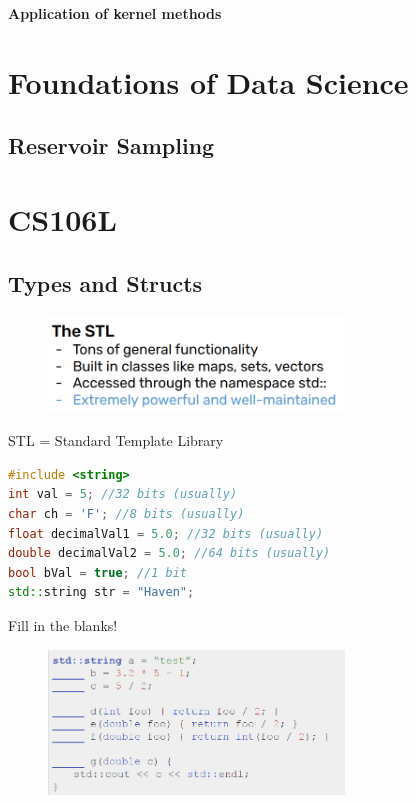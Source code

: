 \documentclass[12pt, a4paper, oneside]{ctexbook}
\begin{document}
\newpage

\textbf{Application of kernel methods}

\hspace*{\fill}


\chapter{Foundations of Data Science}

\section{Reservoir Sampling}


















\chapter{CS106L}

\section{Types and Structs}

  \begin{figure}[h]
		\centering 
		\includegraphics[width=0.7\textwidth]{images1.png} 
	\end{figure}

STL = Standard Template Library

\begin{lstlisting}[language=c++]
#include <string>
int val = 5; //32 bits (usually)
char ch = 'F'; //8 bits (usually)
float decimalVal1 = 5.0; //32 bits (usually)
double decimalVal2 = 5.0; //64 bits (usually)
bool bVal = true; //1 bit
std::string str = "Haven";
\end{lstlisting}

Fill in the blanks!

  \begin{figure}[h]
		\centering 
		\includegraphics[width=0.7\textwidth]{images2.png} 
	\end{figure}
\end{document}
